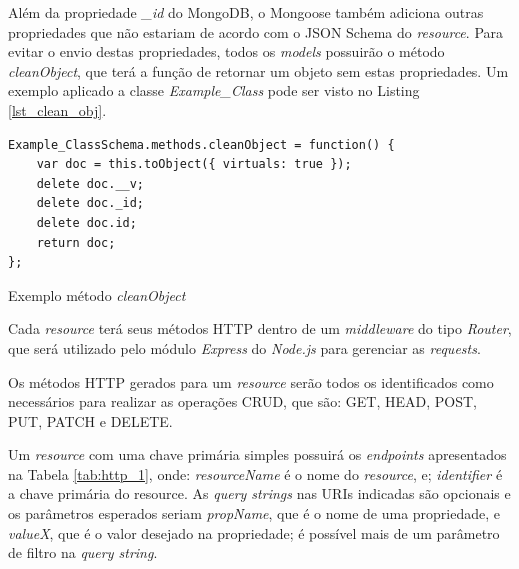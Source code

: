 Além da propriedade \textit{\_id} do MongoDB, o Mongoose também adiciona outras propriedades que não estariam de acordo com o JSON Schema do \textit{resource}. Para evitar o envio destas propriedades, todos os \textit{models} possuirão o método \textit{cleanObject}, que terá a função de retornar um objeto sem estas propriedades. Um exemplo aplicado a classe \textit{Example\_Class} pode ser visto no Listing \ref{lst_clean_obj}.

\begin{listing}
\begin{verbatim}
Example_ClassSchema.methods.cleanObject = function() {
    var doc = this.toObject({ virtuals: true });
    delete doc.__v;
    delete doc._id;
    delete doc.id;
    return doc;
};
\end{verbatim}
\caption{Exemplo método \textit{cleanObject}}
\label{lst_clean_obj}
\end{listing}

\label{sec:bnf:http}

Cada \textit{resource} terá seus métodos HTTP dentro de um \textit{middleware} do tipo \textit{Router}, que será utilizado pelo módulo \textit{Express} do \textit{Node.js} para gerenciar as \textit{requests}.

Os métodos HTTP gerados para um \textit{resource} serão todos os identificados como necessários para realizar as operações CRUD, que são: GET, HEAD, POST, PUT, PATCH e DELETE.

Um \textit{resource} com uma chave primária simples possuirá os \textit{endpoints} apresentados na Tabela \ref{tab:http_1}, onde: \textit{resourceName} é o nome do \textit{resource}, e; \textit{identifier} é a chave primária do resource. As \textit{query strings} nas URIs indicadas são opcionais e os parâmetros esperados seriam \textit{propName}, que é o nome de uma propriedade, e \textit{valueX}, que é o valor desejado na propriedade; é possível mais de um parâmetro de filtro na \textit{query string}.

